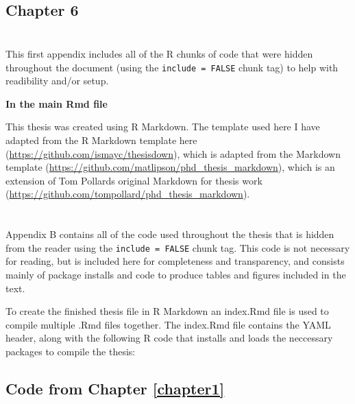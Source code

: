 \documentclass[11pt,twoside]{bristolthesis}
\newenvironment{Shaded}{\begin{snugshade}}{\end{snugshade}}
\newcommand{\KeywordTok}[1]{\textcolor[rgb]{0.13,0.29,0.53}{\textbf{#1}}}
\newcommand{\NormalTok}[1]{#1}
\newcommand{\OperatorTok}[1]{\textcolor[rgb]{0.81,0.36,0.00}{\textbf{#1}}}
\newcommand{\StringTok}[1]{\textcolor[rgb]{0.31,0.60,0.02}{#1}}
\begin{document}
\hypertarget{chapter-6}{%
\section{Chapter 6}\label{chapter-6}}

\hypertarget{section-1}{%
\chapter{}\label{section-1}}

This first appendix includes all of the R chunks of code that were hidden throughout the document (using the \texttt{include\ =\ FALSE} chunk tag) to help with readibility and/or setup.

\textbf{In the main Rmd file}

This thesis was created using R Markdown. The template used here I have adapted from the R Markdown template here (\url{https://github.com/ismayc/thesisdown}), which is adapted from the Markdown template (\url{https://github.com/matlipson/phd_thesis_markdown}), which is an extension of Tom Pollards original Markdown for thesis work (\url{https://github.com/tompollard/phd_thesis_markdown}).

\hypertarget{section-2}{%
\chapter{}\label{section-2}}

Appendix B contains all of the code used throughout the thesis that is hidden from the reader using the \texttt{include\ =\ FALSE} chunk tag. This code is not necessary for reading, but is included here for completeness and transparency, and consists mainly of package installs and code to produce tables and figures included in the text.

To create the finished thesis file in R Markdown an index.Rmd file is used to compile multiple .Rmd files together. The index.Rmd file contains the YAML header, along with the following R code that installs and loads the neccessary packages to compile the thesis:
\begin{Shaded}
\end{Shaded}
\hypertarget{code-from-chapter-refchapter1}{%
\section{Code from Chapter \ref{chapter1}}\label{code-from-chapter-refchapter1}}
\end{document}
